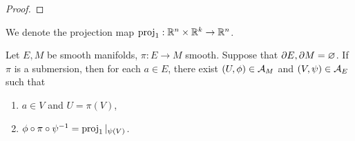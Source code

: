 \documentclass{book}
\begin{document}
	\begin{proof}
	\end{proof}	

	\begin{note}
		We denote the projection map $\operatorname{\text{proj}}_1: \mathbb{R}^n \times \mathbb{R}^k \rightarrow \mathbb{R}^n$.
	\end{note}

	\begin{ex} 
		Let $E, M$ be smooth manifolds, $\pi:E \rightarrow M$ smooth. Suppose that $\partial E, \partial M = \varnothing$. If $\pi$ is a submersion, then for each $a \in E$, there exist $(U, \phi) \in \mathcal{A}_M$ and $(V, \psi) \in \mathcal{A}_E$ such that 
		\begin{enumerate}
			\item $a \in V$ and $U = \pi(V)$,
			\item $\phi \circ \pi \circ \psi^{-1} = \operatorname{\text{proj}}_1|_{\psi(V)}$. 
		\end{enumerate}
	\end{ex}
\end{document}
